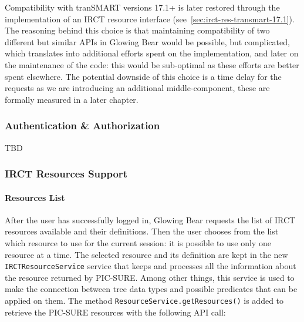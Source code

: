 Compatibility with tranSMART versions 17.1+ is later restored through the implementation of an IRCT resource interface (see~\ref{sec:irct-res-transmart-17.1}).
The reasoning behind this choice is that maintaining compatibility of two different but similar APIs in Glowing Bear would be possible, but complicated, which translates into additional efforts spent on the implementation, and later on the maintenance of the code: this would be sub-optimal as these efforts are better spent elsewhere.
The potential downside of this choice is a time delay for the requests as we are introducing an additional middle-component, these are formally measured in a later chapter.%


\subsubsection{Authentication \& Authorization}


TBD

\subsubsection{IRCT Resources Support}

\paragraph{Resources List}
After the user has successfully logged in, Glowing Bear requests the list of IRCT resources available and their definitions.
Then the user chooses from the list which resource to use for the current session: it is possible to use only one resource at a time. %
The selected resource and its definition are kept in the new \verb|IRCTResourceService| service that keeps and processes all the information about the resource returned by PIC-SURE.
Among other things, this service is used to make the connection between tree data types and possible predicates that can be applied on them.
The method \verb|ResourceService.getResources()| is added to retrieve the PIC-SURE resources with the following API call:

